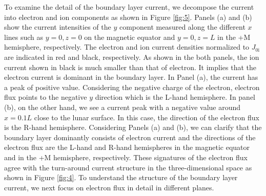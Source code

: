 \documentclass[draft,jgrga]{agutex2015}
\begin{document}
\begin{article}
To examine the detail of the boundary layer current, 
we decompose the current into electron and ion components  
as shown in Figure \ref{fig:5}. 
Panels (a) and (b) show the current intensities of the $y$ component 
measured along the different $x$ lines such as $y=0, z=0$ on the magnetic equator 
and $y=0, z=L$ in the +M hemisphere, respectively.
The electron and ion current densities normalized to $J_\mathrm{0i}$ are 
indicated in red and black, respectively. 
As shown in the both panels, 
the ion current shown in black is much smaller than that of electron. 
It implies that the electron current is dominant in the boundary layer.
In Panel (a), 
the current has a peak of positive value. 
Considering the negative charge of the electron, 
electron flux points to the negative $y$ direction which is the L-hand hemisphere. 
In panel (b), on the other hand,  
we see a current peak with a negative value around $x=0.1L$ close to the lunar surface. 
In this case, the direction of the electron flux is the R-hand hemisphere.  
Considering Panels (a) and (b), 
we can clarify that the boundary layer dominantly consists of electron current 
and the directions of the electron flux are the L-hand and R-hand hemispheres
in the magnetic equator and in the +M hemisphere, respectively.
These signatures of the electron flux agree with the
turn-around current structure in the three-dimensional space 
as shown in Figure \ref{fig:4}.
To understand the structure of the boundary layer current, 
we next focus on electron flux in detail in different planes.



\end{article}
\end{document}
